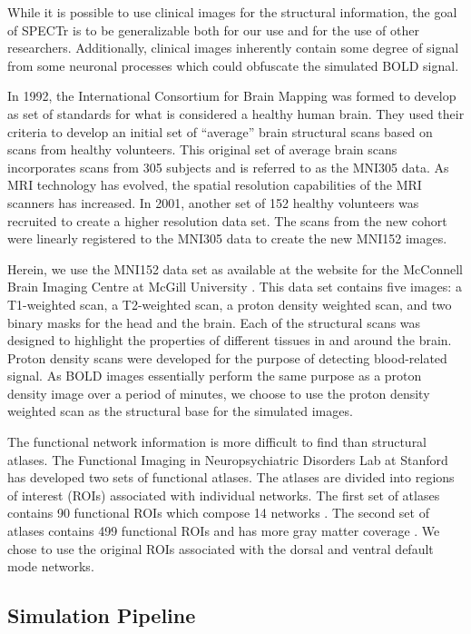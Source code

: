 While it is possible to use clinical images for the structural information, the goal of SPECTr is to be generalizable both for our use and for the use of other researchers. Additionally, clinical images inherently contain some degree of signal from some neuronal processes which could obfuscate the simulated BOLD signal. 

In 1992, the International Consortium for Brain Mapping was formed to develop as set of standards for what is considered a healthy human brain. They used their criteria to develop an initial set of ``average'' brain structural scans based on scans from healthy volunteers. This original set of average brain scans incorporates scans from 305 subjects and is referred to as the MNI305 data. As MRI technology has evolved, the spatial resolution capabilities of the MRI scanners has increased. In 2001, another set of 152 healthy volunteers was recruited to create a higher resolution data set. The scans from the new cohort were linearly registered to the MNI305 data to create the new MNI152 images. %

Herein, we use the MNI152 data set as available at the website for the McConnell Brain Imaging Centre at McGill University \cite{Fonov2009} \cite{Fonov2011}. This data set contains five images: a T1-weighted scan, a T2-weighted scan, a proton density weighted scan, and two binary masks for the head and the brain. Each of the structural scans was designed to highlight the properties of different tissues in and around the brain. Proton density scans were developed for the purpose of detecting blood-related signal. As BOLD images essentially perform the same purpose as a proton density image over a period of minutes, we choose to use the proton density weighted scan as the structural base for the simulated images. 

The functional network information is more difficult to find than structural atlases. The Functional Imaging in Neuropsychiatric Disorders Lab at Stanford has developed two sets of functional atlases. The atlases are divided into regions of interest (ROIs) associated with individual networks. The first set of atlases contains 90 functional ROIs which compose 14 networks \cite{Shirer2012}. The second set of atlases contains 499 functional ROIs and has more gray matter coverage \cite{Altmann2015}. We chose to use the original ROIs associated with the dorsal and ventral default mode networks.

\subsection{Simulation Pipeline}

